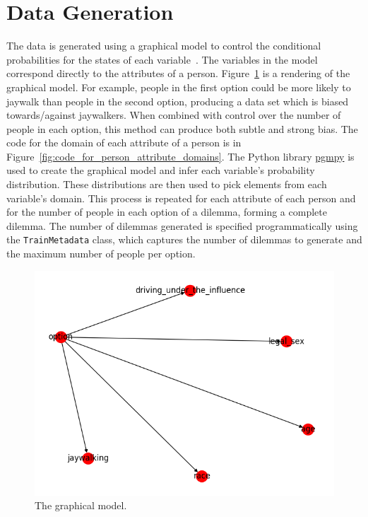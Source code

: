 \documentclass[paper=a4paper]{report}
\newcommand{\code}{\texttt}
\begin{document}
\section{Data Generation}

The data is generated using a graphical model to control the conditional probabilities for the
states of each variable~\cite{blei2003latent}. The variables in the model correspond directly to the
attributes of a person. Figure~\ref{fig:graphical_model_image} is a rendering of the graphical
model. For example, people in the first option could be more likely to jaywalk than people in the
second option, producing a data set which is biased towards/against jaywalkers. When combined with
control over the number of people in each option, this method can produce both subtle and strong
bias. The code for the domain of each attribute of a person is in
Figure~\ref{fig:code_for_person_attribute_domains}. The Python library
\href{https://github.com/pgmpy/pgmpy}{pgmpy} is used to create the graphical model and infer each
variable’s probability distribution. These distributions are then used to pick elements from each
variable’s domain. This process is repeated for each attribute of each person and for the number of
people in each option of a dilemma, forming a complete dilemma. The number of dilemmas generated is
specified programmatically using the \code{TrainMetadata} class, which captures the number of
dilemmas to generate and the maximum number of people per option.

\begin{figure}[h]
    \centering
    \includegraphics[scale=0.6]{figures/network.png}
    \caption[]{The graphical model.}
    \label{fig:graphical_model_image}
\end{figure}
\end{document}

